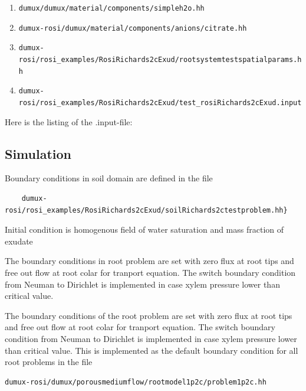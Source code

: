 \begin{enumerate}
\item \verb+dumux/dumux/material/components/simpleh2o.hh+
\item \verb+dumux-rosi/dumux/material/components/anions/citrate.hh+
\item \verb+dumux-rosi/rosi_examples/RosiRichards2cExud/rootsystemtestspatialparams.hh+
\item \verb+dumux-rosi/rosi_examples/RosiRichards2cExud/test_rosiRichards2cExud.input+
\end{enumerate}
Here is the listing of the .input-file:



\subsection*{Simulation}

Boundary conditions in soil domain are defined in the file
\begin{lstlisting}
    dumux-rosi/rosi_examples/RosiRichards2cExud/soilRichards2ctestproblem.hh}
\end{lstlisting}



Initial condition is homogenous field of water saturation and mass fraction of exudate



The boundary conditions in root problem are set with zero flux at root tips and free out flow at root colar for tranport equation. The switch boundary condition from Neuman to Dirichlet is implemented in case xylem pressure lower than critical value.

The boundary conditions of the root problem are set with zero flux at root tips and free out flow at root colar for tranport equation. The switch boundary condition from Neuman to Dirichlet is implemented in case xylem pressure lower than critical value. This is implemented as the default boundary condition for all root problems in the file 
\begin{lstlisting}
dumux-rosi/dumux/porousmediumflow/rootmodel1p2c/problem1p2c.hh
\end{lstlisting}

